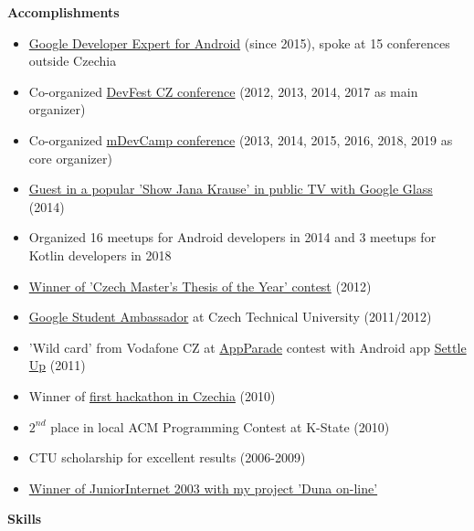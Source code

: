 \documentclass[letterpaper,11pt]{article}
\newcommand{\resheading}[1]{{\large \colorbox{mygrey}{\begin{minipage}{\textwidth}{\textbf{#1 \vphantom{p\^{E}}}}\end{minipage}}}}
\begin{document}
	
\resheading{Accomplishments}
\begin{itemize}
	\item
	\href{https://developers.google.com/experts/}{Google Developer Expert for Android} (since 2015), spoke at 15 conferences outside Czechia
	\item{Co-organized \href{http://www.devfest.cz/}{DevFest CZ conference} (2012, 2013, 2014, 2017 as main organizer)}
	\item{Co-organized \href{http://www.mdevcamp.eu/}{mDevCamp conference} (2013, 2014, 2015, 2016, 2018, 2019 as core organizer)}
	\item
	\href{https://www.youtube.com/watch?v=6z3ScqblqFk}{Guest in a popular 'Show Jana Krause' in public TV with Google Glass} (2014)
	\item Organized 16 meetups for Android developers in 2014 and 3 meetups for Kotlin developers in 2018
	\item \href{http://www.diplomovaprace.cz/}{Winner of 'Czech Master's Thesis of the Year' contest} (2012)
	\item  \href{http://www.google.com/intl/en/jobs/students/proscho/programs/emea/ambassador/}{Google Student Ambassador} at Czech Technical University (2011/2012)
	\item 'Wild card' from Vodafone CZ at \href{http://www.mediar.cz/treti-prehlidku-appparade-ovladly-aplikace-pro-android-zvitezil-night-walker-tomase-zveriny/}{AppParade} contest with Android app \href{https://market.android.com/details?id=cz.destil.settleup}{Settle Up} (2011)
	\item Winner of \href{http://hackathonbrno.blogspot.com/2010/06/v-nabite-aule-jsme-odprezentovali-9.html}{first hackathon in Czechia} (2010)
	\item $2^{nd}$ place in local ACM Programming Contest at K-State (2010) 
	\item CTU scholarship for excellent results (2006-2009)
	\item \href{http://www.juniorinternet.cz/winners/307/david-vavra.aspx}{Winner of JuniorInternet 2003 with my project 'Duna on-line'}
\end{itemize}	
	
\resheading{Skills}
\end{document}

